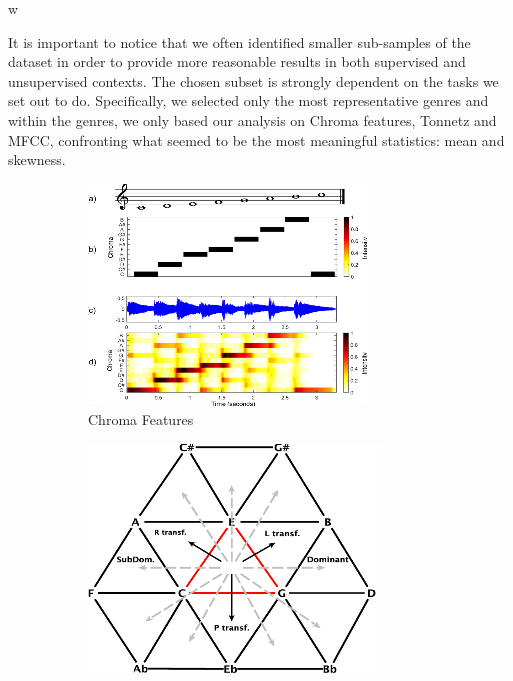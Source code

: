 w\documentclass[11pt, oneside]{article}
\begin{document}
It is important to notice that we often identified smaller sub-samples of the dataset in order to provide more reasonable results in both supervised and unsupervised contexts. The chosen subset is strongly dependent on the tasks we set out to do. Specifically, we selected only the most representative genres and within the genres, we only based our analysis on Chroma features, Tonnetz and MFCC, confronting what seemed to be the most meaningful statistics: mean and skewness.
\begin{figure}[h]
    \centering
    \begin{subfigure}[b]{0.30\textwidth}
        \includegraphics[width=\textwidth]{b.png} 
        \caption{Chroma Features}
        \label{fig:RBFgamma}
    \end{subfigure}\hfill
    \begin{subfigure}[b]{0.30\textwidth}
        \includegraphics[width=\textwidth]{c.png}

\end{subfigure}
\end{figure}
\end{document}
